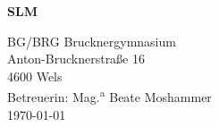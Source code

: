 \documentclass[main.tex]{subfiles}
\begin{document}
    \begin{titlepage}
        \begin{titlepage}
    \begin{center}
        \vspace*{1cm}
            
        \Huge
        \textbf{SLM}
            
        \vspace{1.2cm}
            
        \vspace{1cm}

        \vfill
            
        \vspace{0.8cm}
            
            
        \Large
        BG/BRG Brucknergymnasium\\
        Anton-Brucknerstraße 16\\
        4600 Wels\\
        Betreuerin: Mag.\textsuperscript{a} Beate Moshammer\\
        \vspace{1.5cm}
        \today
            
    \end{center}
\end{titlepage}
    \end{titlepage}
\end{document}
